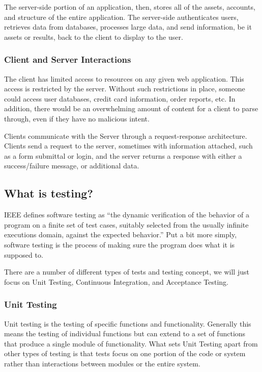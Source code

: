 \documentclass[11pt]{article}
\begin{document}
The server-side portion of an application, then, stores all of the assets, accounts, and structure of the entire application. The server-side authenticates users, retrieves data from databases, processes large data, and send information, be it assets or results, back to the client to display to the user.

\subsubsection{Client and Server Interactions}
The client has limited access to resources on any given web application. This access is restricted by the server. Without such restrictions in place, someone could access user databases, credit card information, order reports, etc. In addition, there would be an overwhelming amount of content for a client to parse through, even if they have no malicious intent.

Clients communicate with the Server through a request-response architecture. Clients send a request to the server, sometimes with information attached, such as a form submittal or login, and the server returns a response with either a success/failure message, or additional data.


\subsection{What is testing?}
IEEE defines software testing as ``the dynamic verification of the behavior of a program on a finite set of test cases, suitably selected from the usually infinite executions domain, against the expected behavior.'' \cite{TestingDefinition} Put a bit more simply, software testing is the process of making sure the program does what it is supposed to.

There are a number of different types of tests and testing concept, we will just focus on Unit Testing, Continuous Integration, and Acceptance Testing.

\subsubsection{Unit Testing}
Unit testing is the testing of specific functions and functionality. Generally this means the testing of individual functions but can extend to a set of functions that produce a single module of functionality. What sets Unit Testing apart from other types of testing is that tests focus on one portion of the code or system rather than interactions between modules or the entire system.
\end{document}
